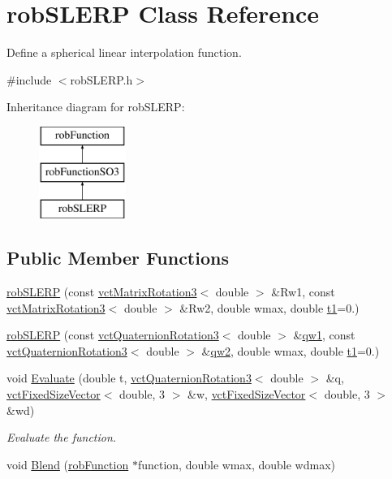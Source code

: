 \hypertarget{classrob_s_l_e_r_p}{}\section{rob\+S\+L\+E\+R\+P Class Reference}
\label{classrob_s_l_e_r_p}


Define a spherical linear interpolation function.  




{\ttfamily \#include $<$rob\+S\+L\+E\+R\+P.\+h$>$}

Inheritance diagram for rob\+S\+L\+E\+R\+P\+:\begin{figure}[H]
\begin{center}
\leavevmode
\includegraphics[height=3.000000cm]{d0/dad/classrob_s_l_e_r_p}
\end{center}
\end{figure}
\subsection*{Public Member Functions}
\begin{DoxyCompactItemize}
\item 
\hyperlink{classrob_s_l_e_r_p_abe2cf92f80f117d47750187d40480679}{rob\+S\+L\+E\+R\+P} (const \hyperlink{classvct_matrix_rotation3}{vct\+Matrix\+Rotation3}$<$ double $>$ \&Rw1, const \hyperlink{classvct_matrix_rotation3}{vct\+Matrix\+Rotation3}$<$ double $>$ \&Rw2, double wmax, double \hyperlink{classrob_function_a9a4b408a3a5a8ae927caec3b6bac36ef}{t1}=0.)
\item 
\hyperlink{classrob_s_l_e_r_p_aaaeb4084e143f4ed8ffcbd0473fb75bd}{rob\+S\+L\+E\+R\+P} (const \hyperlink{classvct_quaternion_rotation3}{vct\+Quaternion\+Rotation3}$<$ double $>$ \&\hyperlink{classrob_function_s_o3_ab39d2e94ec47a7218e8e42209243c628}{qw1}, const \hyperlink{classvct_quaternion_rotation3}{vct\+Quaternion\+Rotation3}$<$ double $>$ \&\hyperlink{classrob_function_s_o3_ae8f7673ef36c4dcf8af771af852b974d}{qw2}, double wmax, double \hyperlink{classrob_function_a9a4b408a3a5a8ae927caec3b6bac36ef}{t1}=0.)
\item 
void \hyperlink{classrob_s_l_e_r_p_a2dd6fee7cb282ece5320c3d74e54af7c}{Evaluate} (double t, \hyperlink{classvct_quaternion_rotation3}{vct\+Quaternion\+Rotation3}$<$ double $>$ \&q, \hyperlink{classvct_fixed_size_vector}{vct\+Fixed\+Size\+Vector}$<$ double, 3 $>$ \&w, \hyperlink{classvct_fixed_size_vector}{vct\+Fixed\+Size\+Vector}$<$ double, 3 $>$ \&wd)
\begin{DoxyCompactList}\small\item\em Evaluate the function. \end{DoxyCompactList}\item 
void \hyperlink{classrob_s_l_e_r_p_ad562f5f1e1f2bc779edbded51d498448}{Blend} (\hyperlink{classrob_function}{rob\+Function} $\ast$function, double wmax, double wdmax)
\end{DoxyCompactItemize}
